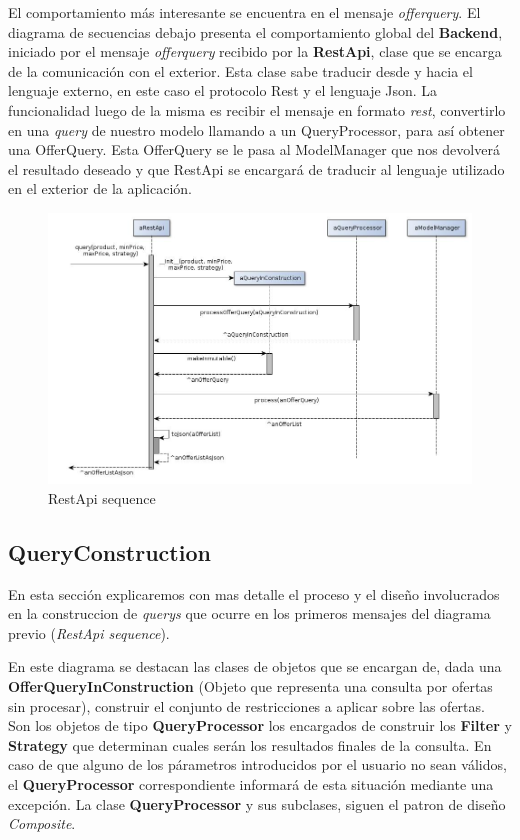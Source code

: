 \documentclass[10pt, a4paper]{article}
\begin{document}
El comportamiento m\'as interesante se encuentra en el mensaje \emph{offerquery}. El diagrama de secuencias debajo presenta el comportamiento global del \textbf{Backend}, iniciado por el mensaje \emph{offerquery} recibido por la \textbf{RestApi}, clase que se encarga de la comunicación con el exterior. Esta clase sabe traducir desde y hacia el lenguaje externo, en este caso el protocolo \textsf{Rest} y el lenguaje \textsf{Json}. La funcionalidad luego de la misma es recibir el mensaje en formato \emph{rest}, convertirlo en una \emph{query} de nuestro modelo llamando a un \textsf{QueryProcessor}, para así obtener una \textsf{OfferQuery}. Esta \textsf{OfferQuery} se le pasa al \textsf{ModelManager} que nos devolverá el resultado deseado y que \textsf{RestApi} se encargará de traducir al lenguaje utilizado en el exterior de la aplicación.
\begin{figure}[H]
\centering
\includegraphics[scale=0.5]{graphics/service_sequence.jpg}
\caption{RestApi sequence}
\end{figure}

\subsection{QueryConstruction}
En esta secci\'on explicaremos con mas detalle el proceso y el diseño involucrados en la construccion de \emph{querys} que ocurre en los primeros mensajes del diagrama previo (\emph{RestApi sequence}). 

En este diagrama se destacan las clases de objetos que se encargan de, dada una \textbf{OfferQueryInConstruction} (Objeto que representa una consulta por ofertas sin procesar), construir el conjunto de restricciones a aplicar sobre las ofertas. Son los objetos de tipo \textbf{QueryProcessor} los encargados de construir los \textbf{Filter} y \textbf{Strategy} que determinan cuales serán los resultados finales de la consulta. En caso de que alguno de los párametros introducidos por el usuario no sean válidos, el \textbf{QueryProcessor} correspondiente informará de esta situación mediante una excepción. La clase \textbf{QueryProcessor} y sus subclases, siguen el patron de diseño \emph{Composite}.
\end{document}
